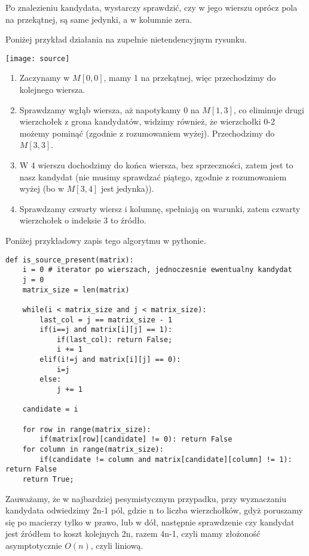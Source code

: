 \documentclass[12pt,a4paper]{article}
\begin{document}
Po znalezieniu kandydata, wystarczy sprawdzić, czy w jego wierszu oprócz pola na przekątnej, są same jedynki, a w kolumnie zera. 

Poniżej przykład działania na zupełnie nietendencyjnym rysunku.
\begin{center}
	\texttt{[image: source]}
\end{center}

\begin{enumerate}
	\item Zaczynamy w \(M[0,0]\), mamy 1 na przekątnej, więc przechodzimy do kolejnego wiersza.
	\item Sprawdzamy wgłąb wiersza, aż napotykamy 0 na \(M[1,3]\), co eliminuje drugi wierzchołek
	z grona kandydatów, widzimy również, że wierzchołki 0-2 możemy pominąć (zgodnie z rozumowaniem
	wyżej). Przechodzimy do \(M[3,3]\).
	\item W 4 wierszu dochodzimy do końca wiersza, bez sprzeczności, zatem jest to nasz kandydat 
	(nie musimy sprawdzać piątego, zgodnie z rozumowaniem wyżej (bo w \(M[3,4]\) jest jedynka)).
	\item Sprawdzamy czwarty wiersz i kolumnę, spełniają on warunki, zatem czwarty wierzchołek o 
	indeksie 3 to źródło.
\end{enumerate}

Poniżej przykładowy zapis tego algorytmu w pythonie.

\begin{lstlisting}
def is_source_present(matrix):
    i = 0 # iterator po wierszach, jednoczesnie ewentualny kandydat
    j = 0
    matrix_size = len(matrix)

    while(i < matrix_size and j < matrix_size):
        last_col = j == matrix_size - 1
        if(i==j and matrix[i][j] == 1):
            if(last_col): return False;
            i += 1
        elif(i!=j and matrix[i][j] == 0):
            i=j
        else:
            j += 1
    
    candidate = i

    for row in range(matrix_size):
        if(matrix[row][candidate] != 0): return False
    for column in range(matrix_size):
        if(candidate != column and matrix[candidate][column] != 1): return False 
    return True;   
\end{lstlisting}

Zauważamy, że w najbardziej pesymistycznym przypadku, przy wyznaczaniu kandydata odwiedzimy 2n-1 pól, gdzie n to liczba wierzchołków, gdyż poruszamy się po macierzy tylko w prawo, lub w dół, następnie sprawdzenie czy kandydat jest źródłem to koszt kolejnych 2n, razem 4n-1, czyli mamy złożoność asymptotycznie \(O(n)\), czyli liniową.
\end{document}
